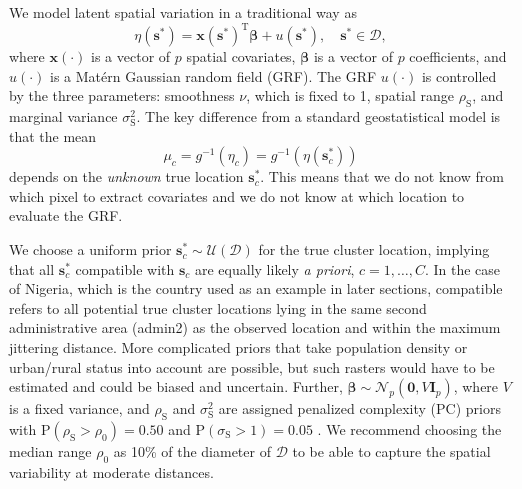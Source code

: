 We model latent spatial variation in a traditional way as
\[
    \eta(\boldsymbol{s}^*) = \boldsymbol{x}(\boldsymbol{s}^*)^\mathrm{T}\boldsymbol{\beta}+u(\boldsymbol{s}^*), \quad \boldsymbol{s}^* \in\mathcal{D},
\]
where $\boldsymbol{x}(\cdot)$ is a vector of $p$ spatial covariates, $\boldsymbol{\beta}$ is a vector of $p$ coefficients, and $u(\cdot)$ is a Matérn Gaussian random field (GRF). The GRF $u(\cdot)$ is controlled by the three parameters: smoothness $\nu$, which is fixed to 1, spatial range $\rho_\mathrm{S}$, and marginal variance $\sigma_\mathrm{S}^2$. The key difference from a standard geostatistical model is that the mean
\[
    \mu_c = g^{-1}(\eta_c) = g^{-1}(\eta(\boldsymbol{s}_c^*))
\]
 depends on the \emph{unknown} true location $\boldsymbol{s}_c^*$. This means that we do not know from which pixel to extract covariates and we do not know at which location to evaluate the GRF.

We choose a uniform prior $\boldsymbol{s}_c^*\sim \mathcal{U}(\mathcal{D})$ for the true cluster location, implying that all $\boldsymbol{s}_c^*$ compatible with $\boldsymbol{s}_c$ are equally likely \emph{a priori}, $c = 1, \ldots, C$.  In the case of Nigeria, which is the country used as an example in later sections, compatible refers to all potential true cluster locations lying in the same second administrative area (admin2) as the observed location and within the maximum jittering distance. More complicated priors that take population density or urban/rural status into account are possible, but such rasters would have to be estimated and could be biased and uncertain.
Further, $\boldsymbol{\beta}\sim\mathcal{N}_p(\boldsymbol{0},V \mathbf{I}_p)$, where $V$ is a fixed variance, and $\rho_\mathrm{S}$ and $\sigma_\mathrm{S}^2$ are assigned penalized complexity (PC) priors with $\mathrm{P}(\rho_\mathrm{S} > \rho_0) = 0.50$ and $\mathrm{P}(\sigma_\mathrm{S} > 1) = 0.05$ \citep{fuglstad:etal:19a}. We recommend choosing the median range $\rho_0$ as 10\% of the diameter of $\mathcal{D}$ to be able to capture the spatial variability at moderate distances. 

